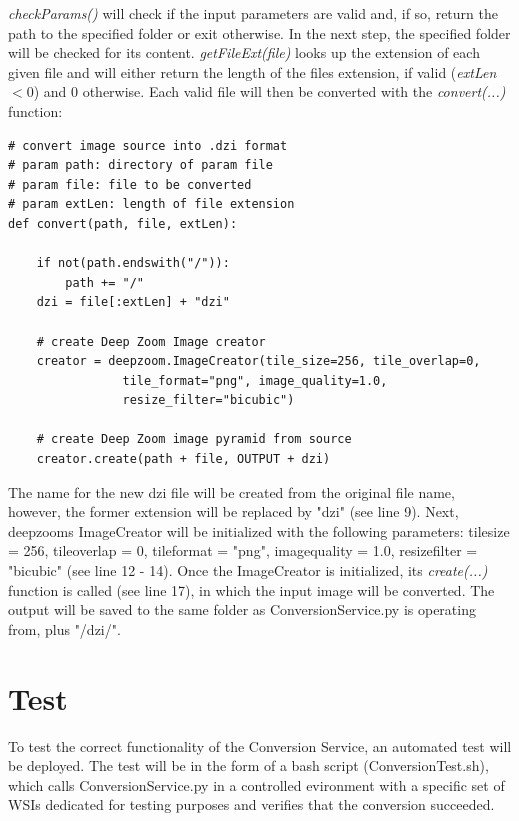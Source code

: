 \emph{checkParams()} will check if the input parameters are valid and, if so, return the path to the specified folder or exit otherwise. In the next step, the specified folder will be checked for its content. \emph{getFileExt(file)} looks up the extension of each given file and will either return the length of the files extension, if valid (\emph{extLen} $<0$) and $0$ otherwise. Each valid file will then be converted with the \emph{convert(...)} function:

\begin{lstlisting}[frame=single]
# convert image source into .dzi format
# param path: directory of param file
# param file: file to be converted
# param extLen: length of file extension
def convert(path, file, extLen):

	if not(path.endswith("/")):
		path += "/"
	dzi = file[:extLen] + "dzi"
	
	# create Deep Zoom Image creator
	creator = deepzoom.ImageCreator(tile_size=256, tile_overlap=0,
				tile_format="png", image_quality=1.0, 
				resize_filter="bicubic")

	# create Deep Zoom image pyramid from source
	creator.create(path + file, OUTPUT + dzi)
\end{lstlisting}

The name for the new dzi file will be created from the original file name, however, the former extension will be replaced by "dzi" (see line 9). Next, deepzooms ImageCreator will be initialized with the following parameters: tile{\textunderscore}size = 256, tile{\textunderscore}overlap = 0, tile{\textunderscore}format = "png", image{\textunderscore}quality = 1.0, resize{\textunderscore}filter = "bicubic" (see line 12 - 14). Once the ImageCreator is initialized, its \emph{create(...)} function is called (see line 17), in which the input image will be converted. The output will be saved to the same folder as ConversionService.py is operating from, plus "/dzi/".


\section{Test}

To test the correct functionality of the Conversion Service, an automated test will be deployed. The test will be in the form of a bash script (ConversionTest.sh), which calls ConversionService.py in a controlled evironment with a specific set of WSIs dedicated for testing purposes and verifies that the conversion succeeded.


